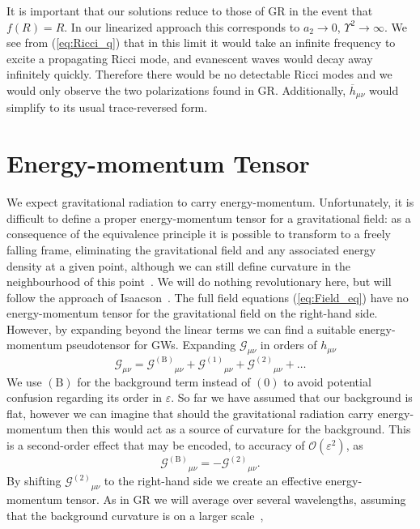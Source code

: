 \documentclass[aps,prd,amsfonts,amssymb,amsmath,nofootinbib,reprint,showpacs]{revtex4-1}
\newcommand{\eqnref}[1]{(\ref{eq:#1})}
\newcommand{\order}[1]{\ensuremath{\mathcal{O}({#1})}}
\begin{document}
It is important that our solutions reduce to those of GR in the event that $f(R) = R$. In our linearized approach this corresponds to $a_2 \rightarrow 0$, $\Upsilon^2 \rightarrow \infty$. We see from \eqnref{Ricci_q} that in this limit it would take an infinite frequency to excite a propagating Ricci mode, and evanescent waves would decay away infinitely quickly. Therefore there would be no detectable Ricci modes and we would only observe the two polarizations found in GR. Additionally, $\overline{h}_{\mu\nu}$ would simplify to its usual trace-reversed form.

\section{Energy-momentum Tensor\label{sec:EM_tensor}}

We expect gravitational radiation to carry energy-momentum. Unfortunately, it is difficult to define a proper energy-momentum tensor for a gravitational field: as a consequence of the equivalence principle it is possible to transform to a freely falling frame, eliminating the gravitational field and any associated energy density at a given point, although we can still define curvature in the neighbourhood of this point~\cite{Misner1973, Hobson2006}. We will do nothing revolutionary here, but will follow the approach of Isaacson~\cite{Isaacson1968, Isaacson1968a}. The full field equations \eqnref{Field_eq} have no energy-momentum tensor for the gravitational field on the right-hand side. However, by expanding beyond the linear terms we can find a suitable energy-momentum pseudotensor for GWs. Expanding $\mathcal{G}_{\mu\nu}$ in orders of $h_{\mu\nu}$
\begin{equation}
\mathcal{G}_{\mu\nu} = {\mathcal{G}^{(\text{B})}}_{\mu\nu} + {\mathcal{G}^{(1)}}_{\mu\nu} + {\mathcal{G}^{(2)}}_{\mu\nu} + \ldots
\label{eq:G_exp}
\end{equation}
We use $(\text{B})$ for the background term instead of $(0)$ to avoid potential confusion regarding its order in $\varepsilon$. So far we have assumed that our background is flat, however we can imagine that should the gravitational radiation carry energy-momentum then this would act as a source of curvature for the background. This is a second-order effect that may be encoded, to accuracy of $\order{\varepsilon^2}$, as
\begin{equation}
{\mathcal{G}^{(\text{B})}}_{\mu\nu} = -{\mathcal{G}^{(2)}}_{\mu\nu}.
\end{equation}
By shifting ${\mathcal{G}^{(2)}}_{\mu\nu}$ to the right-hand side we create an effective energy-momentum tensor. As in GR we will average over several wavelengths, assuming that the background curvature is on a larger scale~\cite{Misner1973},
\end{document}

